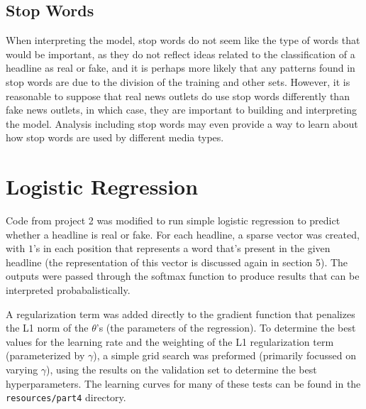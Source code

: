 \documentclass{article}
\begin{document}
   \subsection{Stop Words}
   When interpreting the model, stop words do not seem like the type of words that would be important, as they
   do not reflect ideas related to the classification of a headline as real or fake, and it is perhaps more
   likely that any patterns found in stop words are due to the division of the training and other sets.
   However, it is reasonable to suppose that real news outlets do use stop words differently than fake news
   outlets, in which case, they are important to building and interpreting the model. Analysis including stop
   words may even provide a way to learn about how stop words are used by different media types.


   \section{Logistic Regression}
   Code from project 2 was modified to run simple logistic regression to predict whether a headline is real
   or fake. For each headline, a sparse vector was created, with $1$'s in each position that represents a word
   that's present in the given headline (the representation of this vector is discussed again in section 5).
   The outputs were passed through the softmax function to produce results that can be interpreted probabalistically.

   A regularization term was added directly to the gradient function that penalizes the L1 norm of the
   $\theta$'s (the parameters of the regression).
   To determine the best values for the learning rate and the weighting of the L1 regularization term (parameterized
   by $\gamma$), a simple grid search was preformed (primarily focussed on varying $\gamma$), using the results on
   the validation set to determine the best hyperparameters. The learning curves for many of these tests can be
   found in the \texttt{resources/part4} directory.
\end{document}
